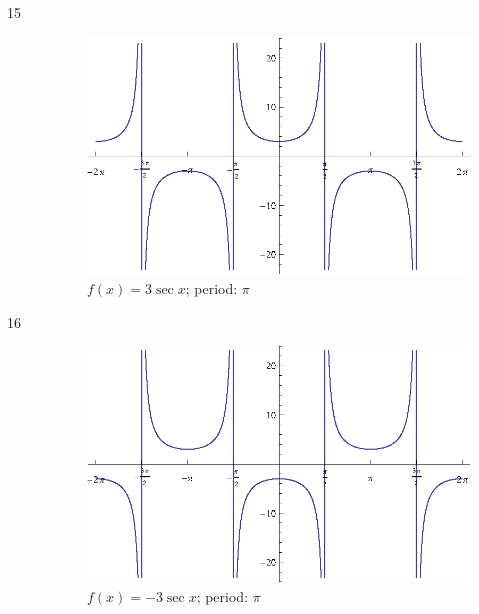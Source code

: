 \documentclass{exam}
\begin{document}
\begin{description}
      \item[15]
        \begin{figure}[H]
          \centering
          \includegraphics[scale=0.9]{exercise15.eps}
          \caption{$f(x) = 3 \sec x$; period: $\pi$}
        \end{figure}

      \item[16]
        \begin{figure}[H]
          \centering
          \includegraphics[scale=0.9]{exercise16.eps}
          \caption{$f(x) = -3 \sec x$; period: $\pi$}
        \end{figure}


\end{description}
\end{document}
